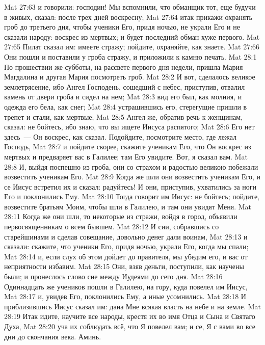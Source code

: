 \vs Mat 27:63 и говорили: господин! Мы вспомнили, что обманщик тот, еще будучи в живых, сказал: после трех дней воскресну;
\vs Mat 27:64 итак прикажи охранять гроб до третьего дня, чтобы ученики Его, придя ночью, не украли Его и не сказали народу: воскрес из мертвых; и будет последний обман хуже первого.
\vs Mat 27:65 Пилат сказал им: имеете стражу; пойдите, охраняйте, как знаете.
\vs Mat 27:66 Они пошли и поставили у гроба стражу, и приложили к камню печать.
\vs Mat 28:1 По прошествии же субботы, на рассвете первого дня недели, пришла Мария Магдалина и другая Мария посмотреть гроб.
\rsbpar\vs Mat 28:2 И вот, сделалось великое землетрясение, ибо Ангел Господень, сошедший с небес, приступив, отвалил камень от двери гроба и сидел на нем;
\vs Mat 28:3 вид его был, как молния, и одежда его бела, как снег;
\vs Mat 28:4 устрашившись его, стерегущие пришли в трепет и стали, как мертвые;
\rsbpar\vs Mat 28:5 Ангел же, обратив речь к женщинам, сказал: не бойтесь, ибо знаю, что вы ищете Иисуса распятого;
\vs Mat 28:6 Его нет здесь~--- Он воскрес, как сказал. Подойдите, посмотрите место, где лежал Господь,
\vs Mat 28:7 и пойдите скорее, скажите ученикам Его, что Он воскрес из мертвых и предваряет вас в Галилее; там Его увидите. Вот, я сказал вам.
\vs Mat 28:8 И, выйдя поспешно из гроба, они со страхом и радостью великою побежали возвестить ученикам Его.
\rsbpar\vs Mat 28:9 Когда же шли они возвестить ученикам Его, и се Иисус встретил их и сказал: радуйтесь! И они, приступив, ухватились за ноги Его и поклонились Ему.
\vs Mat 28:10 Тогда говорит им Иисус: не бойтесь; пойдите, возвестите братьям Моим, чтобы шли в Галилею, и там они увидят Меня.
\vs Mat 28:11 Когда же они шли, то некоторые из стражи, войдя в город, объявили первосвященникам о всем бывшем.
\vs Mat 28:12 И сии, собравшись со старейшинами и сделав совещание, довольно денег дали воинам,
\vs Mat 28:13 и сказали: скажите, что ученики Его, придя ночью, украли Его, когда мы спали;
\vs Mat 28:14 и, если слух об этом дойдет до правителя, мы убедим его, и вас от неприятности избавим.
\vs Mat 28:15 Они, взяв деньги, поступили, как научены были; и пронеслось слово сие между Иудеями до сего дня.
\rsbpar\vs Mat 28:16 Одиннадцать же учеников пошли в Галилею, на гору, куда повелел им Иисус,
\vs Mat 28:17 и, увидев Его, поклонились Ему, а иные усомнились.
\vs Mat 28:18 И приблизившись Иисус сказал им: дана Мне всякая власть на небе и на земле.
\vs Mat 28:19 Итак идите, научите все народы, крестя их во имя Отца и Сына и Святаго Духа,
\vs Mat 28:20 уча их соблюдать всё, что Я повелел вам; и се, Я с вами во все дни до скончания века. Аминь.
